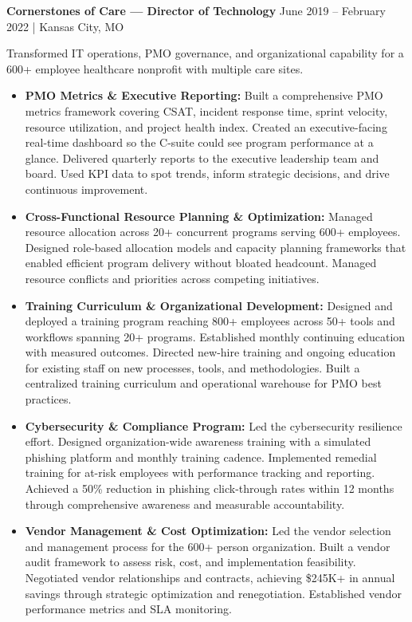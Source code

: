 \documentclass[10pt,letterpaper]{article}
\begin{document}
\vspace{6pt}

\textbf{Cornerstones of Care --- Director of Technology}
\newline
June 2019 -- February 2022 | Kansas City, MO

Transformed IT operations, PMO governance, and organizational capability for a 600+ employee healthcare nonprofit with multiple care sites.

\begin{itemize}
\item \textbf{PMO Metrics \& Executive Reporting:} Built a comprehensive PMO metrics framework covering CSAT, incident response time, sprint velocity, resource utilization, and project health index. Created an executive-facing real-time dashboard so the C-suite could see program performance at a glance. Delivered quarterly reports to the executive leadership team and board. Used KPI data to spot trends, inform strategic decisions, and drive continuous improvement.

\item \textbf{Cross-Functional Resource Planning \& Optimization:} Managed resource allocation across 20+ concurrent programs serving 600+ employees. Designed role-based allocation models and capacity planning frameworks that enabled efficient program delivery without bloated headcount. Managed resource conflicts and priorities across competing initiatives.

\item \textbf{Training Curriculum \& Organizational Development:} Designed and deployed a training program reaching 800+ employees across 50+ tools and workflows spanning 20+ programs. Established monthly continuing education with measured outcomes. Directed new-hire training and ongoing education for existing staff on new processes, tools, and methodologies. Built a centralized training curriculum and operational warehouse for PMO best practices.

\item \textbf{Cybersecurity \& Compliance Program:} Led the cybersecurity resilience effort. Designed organization-wide awareness training with a simulated phishing platform and monthly training cadence. Implemented remedial training for at-risk employees with performance tracking and reporting. Achieved a 50\% reduction in phishing click-through rates within 12 months through comprehensive awareness and measurable accountability.

\item \textbf{Vendor Management \& Cost Optimization:} Led the vendor selection and management process for the 600+ person organization. Built a vendor audit framework to assess risk, cost, and implementation feasibility. Negotiated vendor relationships and contracts, achieving \$245K+ in annual savings through strategic optimization and renegotiation. Established vendor performance metrics and SLA monitoring.


\end{itemize}
\end{document}
